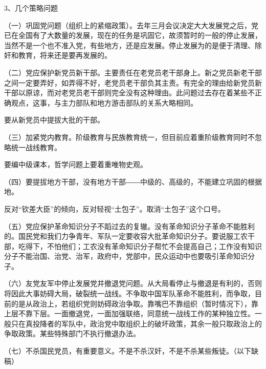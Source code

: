 3、几个策略问题

（一）巩固党问题（组织上的紧缩政策）。去年三月会议决定大大发展党之后，党已在全国有了大数量的发展，现在的任务是巩固它，故须暂时的一般的停止发展，当然不是一个也不准入党，有些地方，还是应发展。停止发展为的是便于清理、除奸和教育，将来还是要再发展的。

（二）党应保护新党员新干部。主要责任在老党员老干部身上。新之党员新老干部之间一定要弄好，如弄得不好，老党员老干部负其主责。有完全的理由给新党员新干部以原谅，而对老党员老干部则完全没有这种理由。此问题过去存在着某些不正确观点，这事，与主力部队和地方游击部队的关系大略相同。

要从新党员中提拔大批的干部。


（三）加紧党内教育。阶级教育与民族教育统一，但目前应着重阶级教育同时不忽略统一战线教育。

要编中级课本，哲学问题上要着重唯物史观。

（四）要提拔地方干部，没有地方干部――中级的、高级的，不能建立巩固的根据地。

反对“钦差大臣”的倾向，反对轻视“土包子”。取消“土包子”这个口号。

（五）党应保护革命知识分子不蹈过去的复辙。没有革命知识分子革命不能胜利的。国民党和我们力争青年、军队一定要收容大批革命知识分子。要说服工农干部，吃得下，不怕他们；工农没有革命知识分子帮忙不会提高自己；工作没有知识分子不能治国、治党、治军，政府中，党部中，民众运动中也要吸引革命知识分子。

（六）友党友军中停止发展党并撤退党问题。从大局看停止与撤退是有利的，否则将因此大事妨碍大局，破裂统一战线。不争取中国军队革命不能胜利，而争取，目前的是从政治上，若组织党则妨碍政治争取。靠嘴巴不靠组织（暂时情况下），靠上层不靠下层。一面撤退党，一面加强联络，同意统一战线工作的某种独立性。一般只在真投降者的军队中，政治党中取组织上的破坏政策，其余一般只取政治上的争取政策。某些特殊部门不执行撤退办法。

（七）不杀国民党员，有重要意义。不是不杀汉奸，不是不杀某些叛徒。（以下缺稿）

